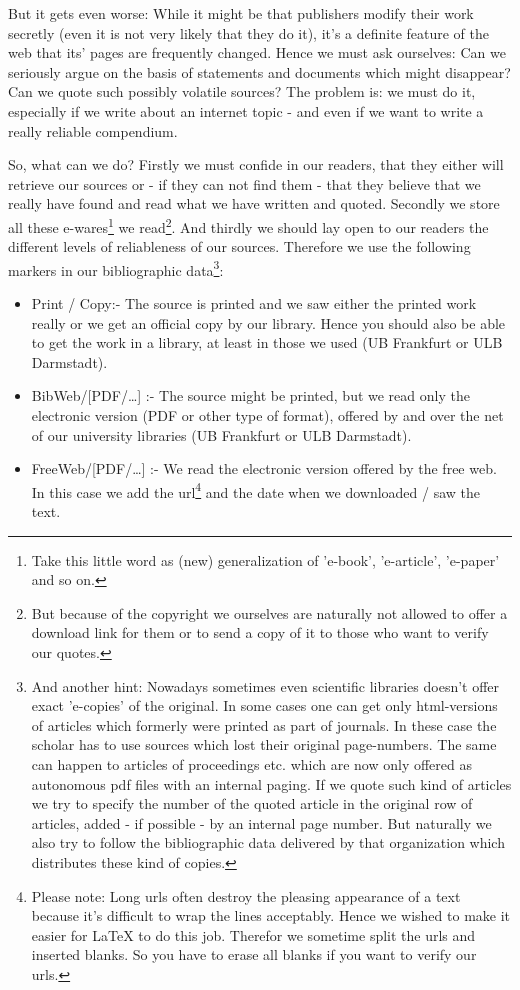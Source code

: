 But it gets even worse: While it might be that publishers modify their work
secretly (even it is not very likely that they do it), it's a definite feature
of the web that its' pages are fre\-quen\-tly changed. Hence we must ask
ourselves: Can we seriously argue on the basis of statements and documents which
might disappear? Can we quote such possibly volatile sources? The problem is: we
must do it, especially if we write about an internet topic - and even if we want
to write a really reliable compendium.

So, what can we do? Firstly we must confide in our readers, that they either
will retrieve our sources or - if they can not find them - that they
believe that we really have found and read what we have written and
quoted. Secondly we store all these e-wares\footnote{Take this little word as
(new) generalization of 'e-book', 'e-article', 'e-paper' and so on.} we
read\footnote{But because of the copyright we ourselves are naturally not
allowed to offer a download link for them or to send a copy of it to those who
want to verify our quotes.}. And thirdly we should lay open to our readers the
different levels of reliableness of our sources. Therefore we use
the following markers in our bibliographic data\footnote{And another hint: Nowadays sometimes
even scientific libraries doesn't offer exact 'e-copies' of the original. In
some cases one can get only html-versions of articles which formerly were
printed as part of journals. In these case the scholar has to use sources which
lost their original page-numbers. The same can happen to articles of proceedings
etc. which are now only offered as autonomous pdf files with an internal paging.
If we quote such kind of articles we try to specify the number of the quoted
article in the original row of articles, added - if possible - by an internal
page number. But naturally we also try to follow the bibliographic data
delivered by that organization which distributes these kind of copies.}:

\begin{itemize}
  \item Print / Copy:- The source is printed and we saw either the printed work
  really or we get an official copy by our library. Hence you should also be able
  to get the work in a library, at least in those we used (UB Frankfurt or ULB
  Darmstadt).
  \item BibWeb/[PDF/\ldots] :- The source might be printed, but we read only the
  electronic version (PDF or other type of format), offered by and over the
  net of our university libraries (UB Frankfurt or ULB Darmstadt).
  \item FreeWeb/[PDF/\ldots] :- We read the electronic version offered by the
  free web. In this case we add the url\footnote{Please note: Long urls often
  destroy the pleasing appearance of a text because it's difficult to wrap the
  lines acceptably. Hence we wished to make it easier for LaTeX to do this job.
  Therefor we sometime split the urls and inserted blanks. So you have to erase
  all blanks if you want to verify our urls.} and the date when we downloaded /
  saw the text.
\end{itemize}


%
